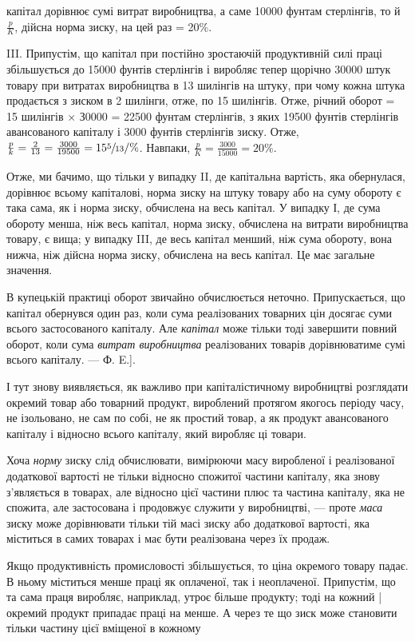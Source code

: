 \parcont{}  %
капітал дорівнює сумі витрат виробництва, а саме 10000 фунтам стерлінгів, то й $\frac{p}{K}$, дійсна норма
зиску, на цей раз = 20\%.

III. Припустім, що капітал при постійно зростаючій продуктивній силі праці збільшується до 15000
фунтів стерлінгів і виробляє тепер щорічно 30000 штук товару при витратах виробництва в 13 шилінгів
на штуку, при чому кожна штука продається з зиском в 2 шилінги, отже, по 15 шилінгів. Отже, річний
оборот = 15 шилінгів × З0000 = 22500 фунтам стерлінгів, з яких 19500 фунтів стерлінгів
авансованого капіталу і 3000 фунтів стерлінгів зиску. Отже,
$\frac{p}{k} = \frac{2}{13} = \frac{3000}{19500} = 15\sfrac{5}{13}/\%$.
Навпаки, $\frac{p}{K} = \frac{3000}{15000} = 20\%$.

Отже, ми бачимо, що тільки у випадку II, де капітальна вартість, яка обернулася, дорівнює всьому
капіталові, норма зиску на штуку товару або на суму обороту є така сама, як і норма зиску, обчислена
на весь капітал. У випадку І, де сума обороту менша, ніж весь капітал, норма зиску, обчислена на
витрати виробництва товару, є вища; у випадку III, де весь капітал менший, ніж сума обороту, вона
нижча, ніж дійсна норма зиску, обчислена на весь капітал. Це має загальне значення.

В купецькій практиці оборот звичайно обчислюється неточно. Припускається, що капітал обернувся один
раз, коли сума реалізованих товарних цін досягає суми всього застосованого капіталу. Але \emph{капітал}
може тільки тоді завершити повний оборот, коли сума \emph{витрат виробництва} реалізованих товарів
дорівнюватиме сумі всього капіталу. — Ф. E.].

І тут знову виявляється, як важливо при капіталістичному виробництві розглядати окремий товар або
товарний продукт, вироблений протягом якогось періоду часу, не ізольовано, не сам по собі, не як
простий товар, а як продукт авансованого капіталу і відносно всього капіталу, який виробляє ці
товари.

Хоча \emph{норму} зиску слід обчислювати, вимірюючи масу виробленої і реалізованої додаткової вартості не
тільки відносно спожитої частини капіталу, яка знову з’являється в товарах, але відносно цієї
частини плюс та частина капіталу, яка не спожита, але застосована і продовжує служити у виробництві,
— проте \emph{маса} зиску може дорівнювати тільки тій масі зиску або додаткової вартості, яка міститься в
самих товарах і має бути реалізована через їх продаж.

Якщо продуктивність промисловості збільшується, то ціна окремого товару падає. В ньому міститься
менше праці як оплаченої, так і неоплаченої. Припустім, що та сама праця виробляє, наприклад, утроє
більше продукту; тоді на кожний | окремий продукт припадає праці на  менше. А через те що зиск
може становити тільки частину цієї вміщеної в кожному
\parbreak{}  %
